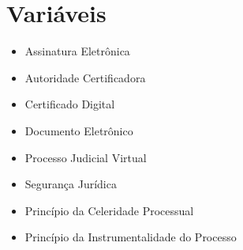 \chapter{Variáveis}
\begin{itemize}
    \item Assinatura Eletrônica
    \item Autoridade Certificadora
    \item Certificado Digital
    \item Documento Eletrônico
    \item Processo Judicial Virtual
    \item Segurança Jurídica
    \item Princípio da Celeridade Processual
    \item Princípio da Instrumentalidade do Processo
\end{itemize}
